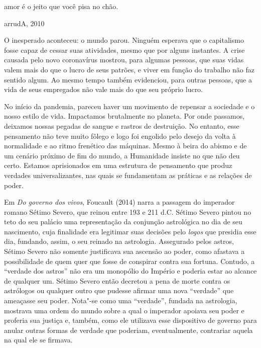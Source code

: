 
\epigraph{amor é o jeito que você pisa no chão.}{arrudA, 2010}

\noindent{}O inesperado aconteceu: o mundo parou. Ninguém esperava que o
capitalismo fosse capaz de cessar suas atividades, mesmo que por alguns
instantes. A crise causada pelo novo coronavírus mostrou, para algumas
pessoas, que suas vidas valem mais do que o lucro de seus patrões, e
viver em função do trabalho não faz sentido algum. Ao mesmo tempo também
evidenciou, para outras pessoas, que a vida de seus empregados não vale
mais do que seu próprio lucro.

No início da pandemia, pareceu haver um movimento de repensar a
sociedade e o nosso estilo de vida. Impactamos brutalmente no planeta.
Por onde passamos, deixamos nossas pegadas de sangue e rastros de
destruição. No entanto, esse pensamento não teve muito fôlego e logo foi
engolido pelo desejo da volta à normalidade e ao ritmo frenético das
máquinas. Mesmo à beira do abismo e de um cenário próximo de fim do
mundo, a Humanidade insiste no que não deu certo. Estamos aprisionados
em uma estrutura de pensamento que produz verdades universalizantes, nas
quais se fundamentam as práticas e as relações de poder.

Em \emph{Do governo dos vivos}, Foucault (2014) narra a passagem do
imperador romano Sétimo Severo, que reinou entre 193 e 211 d.C. Sétimo
Severo pintou no teto do seu palácio uma representação da conjunção
astrológica no dia de seu nascimento, cuja finalidade era legitimar suas
decisões pelo \emph{logos} que presidia esse dia, fundando, assim, o seu
reinado na astrologia. Assegurado pelos astros, Sétimo Severo não
somente justificava sua ascensão ao poder, como afastava a possibilidade
de quem quer que fosse de conspirar contra sua fortuna. Contudo, a
``verdade dos astros'' não era um monopólio do Império e poderia estar
ao alcance de qualquer um. Sétimo Severo então decretou a pena de morte
contra os astrólogos ou qualquer outro que pudesse afirmar uma nova
``verdade'' que ameaçasse seu poder. Nota"-se como uma ``verdade'',
fundada na astrologia, mostrava uma ordem do mundo sobre a qual o
imperador apoiava seu poder e proferia sua justiça e, também, como ele
utilizava esse dispositivo de governo para anular outras formas de
verdade que poderiam, eventualmente, contrariar aquela na qual ele se
firmava.

